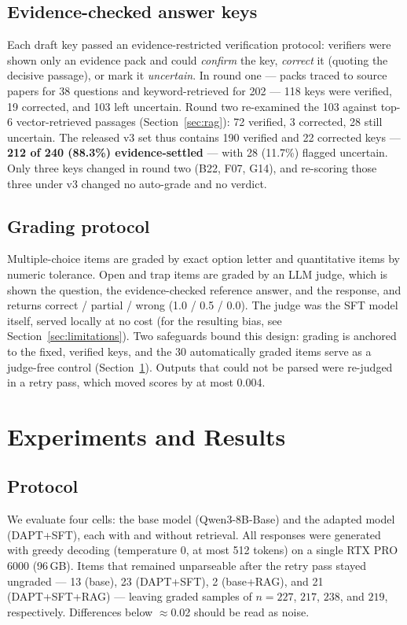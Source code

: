 \documentclass[11pt]{article}
\begin{document}
\subsection{Evidence-checked answer keys}
\label{sec:keys}

Each draft key passed an evidence-restricted verification protocol:
verifiers were shown only an evidence pack and could \emph{confirm}
the key, \emph{correct} it (quoting the decisive passage), or mark it
\emph{uncertain}. In round one --- packs traced to source papers for
38 questions and keyword-retrieved for 202 --- 118 keys were verified,
19 corrected, and 103 left uncertain. Round two re-examined the 103
against top-6 vector-retrieved passages (Section~\ref{sec:rag}): 72
verified, 3 corrected, 28 still uncertain. The released v3 set thus
contains 190 verified and 22 corrected keys --- \textbf{212 of 240
(88.3\%) evidence-settled} --- with 28 (11.7\%) flagged uncertain. Only
three keys changed in round two (B22, F07, G14), and re-scoring those
three under v3 changed no auto-grade and no verdict.

\subsection{Grading protocol}
\label{sec:grading}

Multiple-choice items are graded by exact option letter and
quantitative items by numeric tolerance. Open and trap items are
graded by an LLM judge, which is shown the question, the
evidence-checked reference answer, and the response, and returns
correct / partial / wrong (1.0 / 0.5 / 0.0). The judge was the SFT
model itself, served locally at no cost (for the resulting bias, see
Section~\ref{sec:limitations}). Two safeguards bound this design:
grading is anchored to the fixed, verified keys, and the 30
automatically graded items serve as a judge-free control
(Section~\ref{sec:experiments}). Outputs that could not be parsed
were re-judged in a retry pass, which moved scores by at most 0.004.

\section{Experiments and Results}
\label{sec:experiments}

\subsection{Protocol}

We evaluate four cells: the base model (Qwen3-8B-Base) and the adapted
model (DAPT+SFT), each with and without retrieval. All responses were
generated with greedy decoding (temperature 0, at most 512 tokens) on
a single RTX PRO 6000 (96\,GB). Items that remained unparseable after
the retry pass stayed ungraded --- 13 (base), 23 (DAPT+SFT), 2
(base+RAG), and 21 (DAPT+SFT+RAG) --- leaving graded samples of $n =
227$, $217$, $238$, and $219$, respectively. Differences below
$\approx$0.02 should be read as noise.
\end{document}
